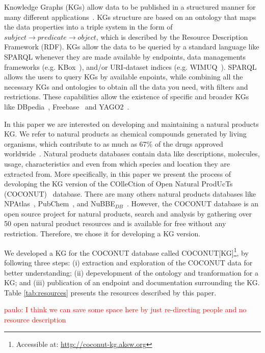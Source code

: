 \documentclass[
]{ceurart}
\begin{document}
Knowledge Graphs (KGs) allow data to be published in a structured manner for many different applications~\cite{hogan2021knowledge}.
KGs structure are based on an ontology that maps the data properties into a triple system in the form of $subject \rightarrow predicate \rightarrow object$, which is described by the Resource Description Framework (RDF).
KGs allow the data to be queried by a standard language like SPARQL whenever they are made available by endpoints, data managements frameworks (e.g. KBox~\cite{marx2017kbox}), and/or URI-dataset indices (e.g. WIMUQ~\cite{valdestilhas2019more}).
SPARQL allows the users to query KGs by available enpoints, while combining all the necessary KGs and ontologies to obtain all the data you need, with filters and restrictions.
These capabilities allow the existence of specific and broader KGs like DBpedia~\cite{lehmann2015dbpedia}, Freebase~\cite{bollacker2008freebase} and YAGO2~\cite{hoffart2013yago2}.

In this paper we are interested on developing and maintaining a natural products KG.
We refer to natural products as chemical compounds generated by living organisms, which contribute to as much as 67\% of the drugs approved worldwide~\cite{newman2016natural}.
Natural products databases contain data like descriptions, molecules, usage, characteristics and even from which species and location they are extracted from.
More specifically, in this paper we present the process of devoloping the KG version of the COlleCtion of Open Natural ProdUcTs (COCONUT)~\cite{sorokina2021coconut} database.
There are many others natural products databases like NPAtlas~\cite{van2019natural,van2022natural}, PubChem~\cite{kim2023pubchem}, and NuBBE$_{DB}$~\cite{valli2013development,pilon2017nubbedb}.
However, the COCONUT database is an open source project for natural products, search and analysis by gathering over 50 open natural product resources and is available for free without any restriction.
Therefore, we chose it for developing a KG version.

We developed a KG for the COCONUT database called COCONUT[KG]\footnote{Accessible at: \url{http://coconut-kg.aksw.org}}, by following three steps: (i) extraction and exploration of the COCONUT data for better understanding; (ii) depevelopment of the ontology and tranformation for a KG; and (iii) publication of an endpoint and documentation surrounding the KG.
Table \ref{tab:resources} presents the resources described by this paper.

\textcolor{red}{paulo: I think we can save some space here by just re-directing people and no resource description}
\end{document}
